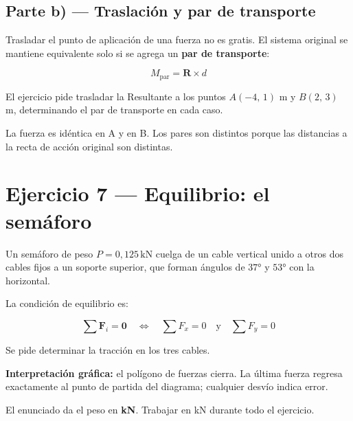 \documentclass[
  spanish,
  11pt,
  a4paper,
]{article}
\begin{document}
\subsection{Parte b) --- Traslación y par de
transporte}\label{parte-b-traslaciuxf3n-y-par-de-transporte}

Trasladar el punto de aplicación de una fuerza no es gratis. El sistema
original se mantiene equivalente solo si se agrega un \textbf{par de
transporte}:

\[M_{\text{par}} = \mathbf{R} \times d\]

El ejercicio pide trasladar la Resultante a los puntos \(A(-4,\,1)\) m y
\(B(2,\,3)\) m, determinando el par de transporte en cada caso.

La fuerza es idéntica en A y en B. Los pares son distintos porque las
distancias a la recta de acción original son distintas.

\section{Ejercicio 7 --- Equilibrio: el
semáforo}\label{ejercicio-7-equilibrio-el-semuxe1foro}

Un semáforo de peso \(P = 0{,}125\,\text{kN}\) cuelga de un cable
vertical unido a otros dos cables fijos a un soporte superior, que
forman ángulos de \(37°\) y \(53°\) con la horizontal.

La condición de equilibrio es:

\[\sum \mathbf{F}_i = \mathbf{0} \quad \Leftrightarrow \quad \sum F_x = 0 \quad \text{y} \quad \sum F_y = 0\]

Se pide determinar la tracción en los tres cables.

\textbf{Interpretación gráfica:} el polígono de fuerzas cierra. La
última fuerza regresa exactamente al punto de partida del diagrama;
cualquier desvío indica error.

\begin{tcolorbox}[enhanced jigsaw, bottomrule=.15mm, bottomtitle=1mm, titlerule=0mm, leftrule=.75mm, rightrule=.15mm, title=\textcolor{quarto-callout-warning-color}{\faExclamationTriangle}\hspace{0.5em}{Advertencia}, coltitle=black, colframe=quarto-callout-warning-color-frame, left=2mm, opacitybacktitle=0.6, opacityback=0, toptitle=1mm, toprule=.15mm, colbacktitle=quarto-callout-warning-color!10!white, colback=white, breakable, arc=.35mm]

El enunciado da el peso en \textbf{kN}. Trabajar en kN durante todo el
ejercicio.

\end{tcolorbox}
\end{document}
